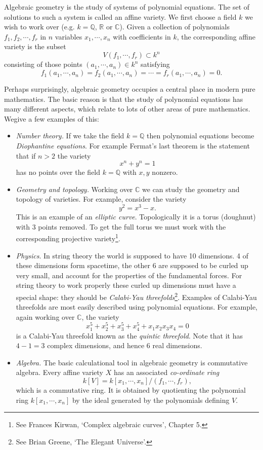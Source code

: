 \documentclass [12pt,oneside,a4paper,mathscr]{amsart}
\theoremstyle{definition}
\newcommand {\C}{\mathbb C}
\newcommand{\Q}{\mathbb{Q}}
\newcommand{\R}{\mathbb{R}}
\begin{document}
Algebraic geometry is the study of  systems of polynomial equations. The set of solutions to such a system is called an affine variety. We first choose a field $k$ we wish to work over (e.g. $k=\Q$, $\R$ or $\C$). Given a collection of polynomials  $f_1,f_2,\cdots, f_r$  in $n$ variables $x_1,\cdots, x_n$ with coefficients in $k$, the corresponding  affine variety  is the subset \[V(f_1,\cdots, f_r)\subset k^n\] consisting of those points $(a_1,\cdots,a_n)\in k^n$ satisfying
\[f_1(a_1,\cdots,a_n)=f_2(a_1,\cdots,a_n)=\cdots=f_r(a_1,\cdots,a_n)=0.\]


Perhaps surprisingly, algebraic geometry occupies a central place in modern pure mathematics. The basic reason is that the study of polynomial equations has many different aspects, which relate to lots of other areas of pure mathematics. Wegive a few examples of this:

\begin{itemize}
\item \emph{Number theory.} If we take the field $k=\Q$ then polynomial equations become \emph{Diophantine equations}. For example Fermat's last theorem is the statement that if $n>2$ the variety
\[x^n+y^n=1\]
has no points over the field $k=\Q$ with $x,y$ nonzero. 
\smallskip

\item \emph{Geometry and topology.} Working over $\C$ we can study the geometry and topology of varieties. For example, consider the variety
\[y^2=x^3-x.\]
This is an example of  an \emph{elliptic curve}. Topologically it is a torus (doughnut) with 3 points removed. To get the full torus we must work  with the corresponding  projective variety\footnote{See Frances Kirwan, `Complex algebraic curves', Chapter 5.}.

\smallskip
\item \emph{Physics}. In string theory the world is supposed to  have 10 dimensions. 4 of these dimensions form spacetime, the other 6 are supposed to be curled up very small, and account for the properties of the fundamental forces. For string theory to work properly these curled up dimensions must have a special shape: they should be \emph{Calabi-Yau threefolds}\footnote{See Brian Greene, `The Elegant Universe'.}.  Examples of Calabi-Yau threefolds are most easily described using polynomial equations. For example, again working over $\C$,  the variety
\[x_1^5 + x_2^5 + x_3^5 + x_4^5 + x_1 x_2 x_3 x_4=0\]
is a Calabi-Yau threefold known as the \emph{quintic threefold}. Note that it has $4-1=3$ complex dimensions, and hence 6 real dimensions.
\smallskip

\item \emph{Algebra.} The basic calculational tool in algebraic geometry is commutative algebra. Every affine variety $X$ has an associated \emph{co-ordinate ring} \[k[V]=k[x_1,\cdots,x_n]/(f_1,\cdots, f_r),\] which is a commutative ring. It is obtained by quotienting the polynomial ring $k[x_1,\cdots, x_n]$ by the ideal  generated by the  polynomials defining $V$.
\end{itemize}
\end{document}
